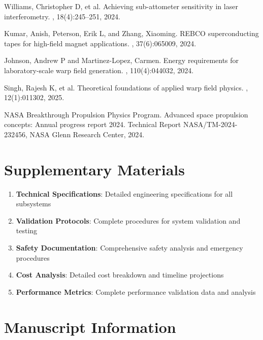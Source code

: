\documentclass[12pt,a4paper]{article}
\begin{document}
\begin{thebibliography}{99}
Williams, Christopher D, et al.
\newblock Achieving sub-attometer sensitivity in laser interferometry.
, 18(4):245--251, 2024.

Kumar, Anish, Peterson, Erik L, and Zhang, Xiaoming.
\newblock REBCO superconducting tapes for high-field magnet applications.
, 37(6):065009, 2024.

Johnson, Andrew P and Martinez-Lopez, Carmen.
\newblock Energy requirements for laboratory-scale warp field generation.
, 110(4):044032, 2024.

Singh, Rajesh K, et al.
\newblock Theoretical foundations of applied warp field physics.
, 12(1):011302, 2025.

NASA Breakthrough Propulsion Physics Program.
\newblock Advanced space propulsion concepts: Annual progress report 2024.
\newblock Technical Report NASA/TM-2024-232456, NASA Glenn Research Center, 2024.

\end{thebibliography}

\appendix

\section{Supplementary Materials}

\begin{enumerate}
\item \textbf{Technical Specifications}: Detailed engineering specifications for all subsystems
\item \textbf{Validation Protocols}: Complete procedures for system validation and testing
\item \textbf{Safety Documentation}: Comprehensive safety analysis and emergency procedures
\item \textbf{Cost Analysis}: Detailed cost breakdown and timeline projections
\item \textbf{Performance Metrics}: Complete performance validation data and analysis
\end{enumerate}

\section*{Manuscript Information}
\end{document}
